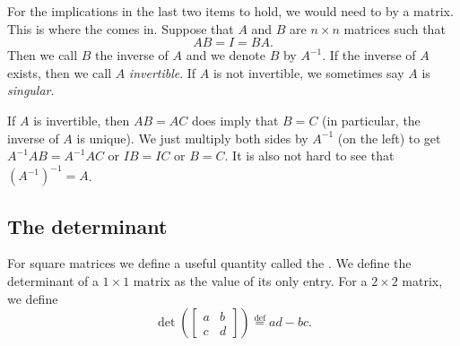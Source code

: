For the implications in the last two items to hold,
we would need to  by
a matrix.  This is where the \emph{} comes in.
Suppose that $A$ and $B$ are $n \times n$ matrices such that
\begin{equation*}
AB = I = BA .
\end{equation*}
Then we call $B$ the inverse of $A$ and we denote $B$ by $A^{-1}$.
If the inverse of $A$ exists, then we call $A$
\emph{invertible}.
If $A$ is not invertible, we sometimes say $A$ is
\emph{singular}.

If $A$ is invertible, then $AB = AC$ does imply
that $B = C$ (in particular, the inverse of $A$ is unique).
We just multiply both sides by $A^{-1}$ (on the left) to get
$A^{-1}AB = A^{-1}AC$ or $IB=IC$ or $B=C$.
It is also not hard to see that ${(A^{-1})}^{-1} = A$.

\subsection{The determinant}

For square matrices we define a useful quantity called the
\emph{}.  We define
the determinant of a $1 \times 1$ matrix as the value of its only entry.
For a $2 \times 2$ matrix, we define
\begin{equation*}
\det \left(
\begin{bmatrix}
a & b \\
c & d
\end{bmatrix}
\right)
\overset{\text{def}}{=}
ad-bc .
\end{equation*}

